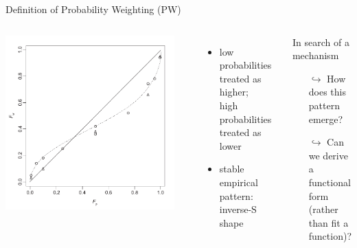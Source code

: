 \begin{frame}{Definition of Probability Weighting (PW)}

\begin{columns}[T]
	\includegraphics[width=.9\textwidth]{../../figs/TK1992.pdf}

\parencite[p. 310, Fig. 1,relabelled axes]{TverskyKahneman1992}

\begin{itemize}
  \item low probabilities treated as higher;\\ 
  high probabilities treated as lower
  \item stable empirical pattern: inverse-S shape
\end{itemize}

\bi
	\item	{}
\ei

\begin{block}{In search of a mechanism}
	\begin{itemize}
	  \item[$\hookrightarrow$] How does this pattern emerge?
  	\item[$\hookrightarrow$] Can we derive a functional form\\ 
	(rather than fit a function)?
	\end{itemize}
\end{block}

\end{columns}
\end{frame}

